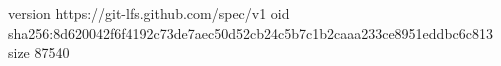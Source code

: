 version https://git-lfs.github.com/spec/v1
oid sha256:8d620042f6f4192c73de7aec50d52cb24c5b7c1b2caaa233ce8951eddbc6c813
size 87540
